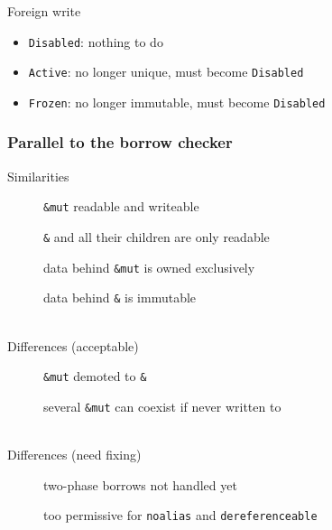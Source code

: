 \begin{frame}[t]
\begin{onlyenv}
        \begin{block}{Foreign write}
            \begin{itemize}
                \item \texttt{Disabled}: nothing to do
                \item \texttt{Active}: no longer unique, must become \texttt{Disabled}
                \item \texttt{Frozen}: no longer immutable, must become \texttt{Disabled}
            \end{itemize}
        \end{block}
    \end{onlyenv}
\end{frame}


\begin{frame}
    \frametitle{Parallel to the borrow checker}
    Similarities
    \hspace{-5em}
    \begin{description}
        \item[\cmark] \texttt{\&mut} readable and writeable
        \item[\cmark] \texttt{\&} and all their children are only readable
        \item[\cmark] data behind \texttt{\&mut} is owned exclusively
        \item[\cmark] data behind \texttt{\&} is immutable
    \end{description}~\\

    Differences (acceptable)
    \hspace{-5em}
    \begin{description}
        \item[\xmark] \texttt{\&mut} demoted to \texttt{\&}
        \item[\xmark] several \texttt{\&mut} can coexist if never written to
    \end{description}~\\

    Differences (need fixing)
    \hspace{-5em}
    \begin{description}
        \item[\xmark] two-phase borrows not handled yet
        \item[\xmark] too permissive for \texttt{noalias} and \texttt{dereferenceable}
    \end{description}~\\

\end{frame}


